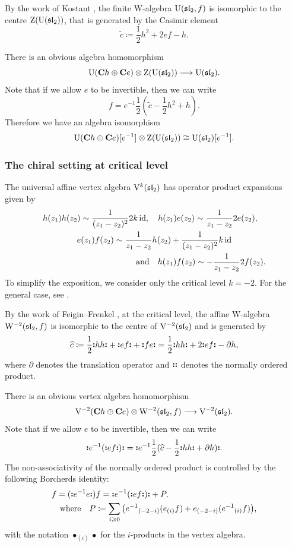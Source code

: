 By the work of Kostant \cite{kostant1978whittaker}, the finite W-algebra $\mathrm U(\mathfrak{sl}_2, f)$ is isomorphic to the centre $\mathrm{Z}(\mathrm U(\mathfrak{sl}_2))$, that is generated by the Casimir element
\[ \widetilde c \coloneqq \frac{1}{2} h^2 + 2 e f - h. \] 

There is an obvious algebra homomorphism
\[ \mathrm U(\mathbf{C} h \oplus \mathbf{C} e) \otimes \mathrm{Z}(\mathrm U(\mathfrak{sl}_2)) \longrightarrow \mathrm U(\mathfrak{sl}_2). \]
Note that if we allow $e$ to be invertible, then we can write
\[ f = e^{-1} \frac{1}{2}(\widetilde{c} - \frac{1}{2} h^2 + h). \]
Therefore we have an algebra isomorphism
\[ \mathrm U(\mathbf{C} h \oplus \mathbf{C} e)[e^{-1}] \otimes \mathrm{Z}(\mathrm U(\mathfrak{sl}_2)) \cong \mathrm U(\mathfrak{sl}_2)[e^{-1}]. \]

\subsubsection{The chiral setting at critical level}

The universal affine vertex algebra $\mathrm V^k(\mathfrak{sl}_2)$ has operator product expansions given by
\[ \begin{multlined}
	h(z_1) h(z_2) \sim \frac{1}{(z_1 - z_2)^2} 2 k \id, \quad h(z_1) e(z_2) \sim \frac{1}{z_1 - z_2} 2 e(z_2) , \\ e(z_1) f(z_2) \sim \frac{1}{z_1 - z_2} h(z_2) + \frac{1}{(z_1 - z_2)^2} k \id \\ \text{and} \quad h(z_1) f(z_2) \sim - \frac{1}{z_1 - z_2} 2 f(z_2).
\end{multlined} \]
To simplify the exposition, we consider only the critical level $k = -2$. For the general case, see .

By the work of Feigin--Frenkel \cite{feigin1992affine}, at the critical level, the affine W-algebra $\mathrm W^{-2}(\mathfrak{sl}_2, f)$ is isomorphic to the centre of $\mathrm V^{-2}(\mathfrak{sl}_2)$ and is generated by
\[ \widehat c \coloneqq \frac{1}{2} \mathopen{\boldsymbol{\vcentcolon}}h h\mathclose{\boldsymbol{\vcentcolon}} + \mathopen{\boldsymbol{\vcentcolon}}e f\mathclose{\boldsymbol{\vcentcolon}} + \mathopen{\boldsymbol{\vcentcolon}}f e\mathclose{\boldsymbol{\vcentcolon}} = \frac{1}{2} \mathopen{\boldsymbol{\vcentcolon}}h h\mathclose{\boldsymbol{\vcentcolon}} + 2 \mathopen{\boldsymbol{\vcentcolon}}e f\mathclose{\boldsymbol{\vcentcolon}} - \partial h, \]
where $\partial$ denotes the translation operator and $\mathopen{\boldsymbol{\vcentcolon}}\mathclose{\boldsymbol{\vcentcolon}}$ denotes the normally ordered product. 

There is an obvious vertex algebra homomorphism
\[ \mathrm V^{-2}(\mathbf{C} h \oplus \mathbf{C} e) \otimes \mathrm W^{-2}(\mathfrak{sl}_2, f) \longrightarrow \mathrm V^{-2}(\mathfrak{sl}_2). \]
Note that if we allow $e$ to be invertible, then we can write
\[ \mathopen{\boldsymbol{\vcentcolon}}e^{-1} (\mathopen{\boldsymbol{\vcentcolon}}e f\mathclose{\boldsymbol{\vcentcolon}})\mathclose{\boldsymbol{\vcentcolon}} = \mathopen{\boldsymbol{\vcentcolon}}e^{-1} \frac{1}{2}(\widehat{c} - \frac{1}{2} \mathopen{\boldsymbol{\vcentcolon}}h h\mathclose{\boldsymbol{\vcentcolon}} + \partial h)\mathclose{\boldsymbol{\vcentcolon}}. \]
The non-associativity of the normally ordered product is controlled by the following Borcherds identity:
\[ \begin{multlined}
	f = {(\NO{e^{-1} e}) f} = \NO{e^{-1} (\NO{e f})} + P, 
	\\ \text{where} \quad P \coloneqq \sum_{i \geqslant 0} \big(e^{-1}{}_{(-2-i)}(e_{(i)} f) + e{}_{(-2-i)}(e^{-1}{}_{(i)} f)\big), 
\end{multlined}  \]
with the notation $\bullet_{(i)}\bullet$ for the $i$-products in the vertex algebra.

